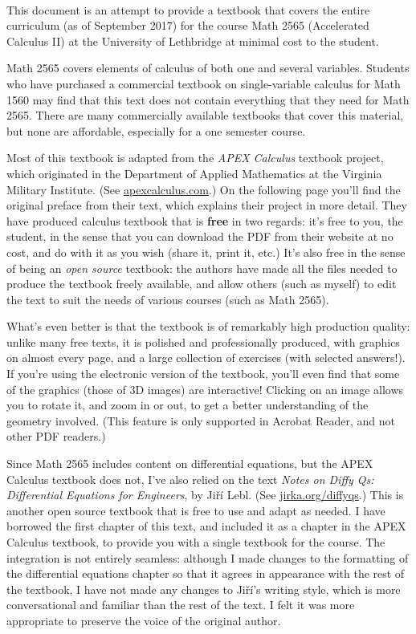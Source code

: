\thispagestyle{empty}
\Huge
{}\\
\normalsize

This document is an attempt to provide a textbook that covers the entire curriculum (as of September 2017) for the course Math 2565 (Accelerated Calculus II) at the University of Lethbridge at minimal cost to the student.

Math 2565 covers elements of calculus of both one and several variables. Students who have purchased a commercial textbook on single-variable calculus for Math 1560 may find that this text does not contain everything that they need for Math 2565. There are many commercially available textbooks that cover this material, but none are affordable, especially for a one semester course. 

Most of this textbook is adapted from the \textit{APEX Calculus} textbook project, which originated in the Department of Applied Mathematics at the Virginia Military Institute. (See \href{http://www.apexcalculus.com}{apexcalculus.com}.) On the following page you'll find the original preface from their text, which explains their project in more detail. They have produced calculus textbook that is \textbf{free} in two regards: it's free to you, the student, in the sense that you can download the PDF from their website at no cost, and do with it as you wish (share it, print it, etc.) It's also free in the sense of being an \textit{open source} textbook: the authors have made all the files needed to produce the textbook freely available, and allow others (such as myself) to edit the text to suit the needs of various courses (such as Math 2565).

What's even better is that the textbook is of remarkably high production quality: unlike many free texts, it is polished and professionally produced, with graphics on almost every page, and a large collection of exercises (with selected answers!). If you're using the electronic version of the textbook, you'll even find that some of the graphics (those of 3D images) are interactive! Clicking on an image allows you to rotate it, and zoom in or out, to get a better understanding of the geometry involved. (This feature is only supported in Acrobat Reader, and not other PDF readers.)

Since Math 2565 includes content on differential equations, but the APEX Calculus textbook does not, I've also relied on the text \textit{Notes on Diffy Qs: Differential Equations for Engineers}, by Ji\v{r}\'i Lebl. (See \href{http://www.jirka.org/diffyqs}{jirka.org/diffyqs}.) This is another open source textbook that is free to use and adapt as needed. I have borrowed the first chapter of this text, and included it as a chapter in the APEX Calculus textbook, to provide you with a single textbook for the course. The integration is not entirely seamless: although I made changes to the formatting of the differential equations chapter so that it agrees in appearance with the rest of the textbook, I have not made any changes to Ji\v{r}\'{i}'s writing style, which is more conversational and familiar than the rest of the text. I felt it was more appropriate to preserve the voice of the original author.

